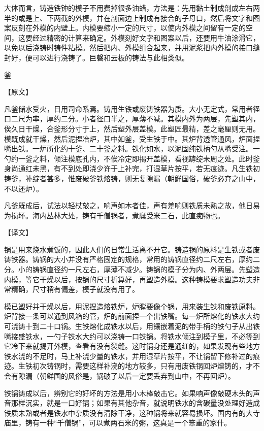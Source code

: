 \documentclass[12pt,UTF8]{ctexbook}
\begin{document}
大体而言，铸造铁钟的模子不用费掉很多油蜡，方法是：先用黏土制成剖成左右两半的或是上、下两截的外模，并在剖面边上制成有接合的子母口，然后将文字和图案反刻在外模的内壁上。内模要缩小一定的尺寸，以使内外模之间留有一定的空间，这要经过精密的计算来确定。外模刻好文字和图案以后，还要用牛油涂滑它，以免以后浇铸时铸件粘模。然后把内、外模组合起来，并用泥浆把内外模的接口缝封好，便可以进行浇铸了。巨磬和云板的铸法与此相类似。

釜

【原文】

凡釜储水受火，日用司命系焉。铸用生铁或废铸铁器为质。大小无定式，常用者径口二尺为率，厚约二分。小者径口半之，厚薄不减。其模内外为两层，先塑其内，俟久日干燥，合釜形分寸于上，然后塑外层盖模。此塑匠最精，差之毫厘则无用。模既成就干燥，然后泥捏冶炉，其中如釜，受生铁于中。其炉背透管通风，炉面捏嘴出铁。一炉所化约十釜、二十釜之料。铁化如水，以泥固纯铁柄勺从嘴受注。一勺约一釜之料，倾注模底孔内，不俟冷定即揭开盖模，看视罅绽未周之处。此时釜身尚通红未黑，有不到处即浇少许于上补完，打湿草片按平，若无痕迹。凡生铁初铸釜，补绽者甚多，惟废破釜铁熔铸，则无复隙漏（朝鲜国俗，破釜必弃之山中，不以还炉）。

凡釜既成后，试法以轻杖敲之，响声如木者佳，声有差响则铁质未熟之故，他日易为损坏。海内丛林大处，铸有千僧锅者，煮糜受米二石，此直痴物也。

【译文】

锅是用来烧水煮饭的，因此人们的日常生活离不开它。铸造锅的原料是生铁或者废铸铁器。铸锅的大小并没有严格固定的规格，常用的铸锅直径约二尺左右，厚约二分。小的铸锅直径约一尺左右，厚薄不减少。铸锅的模子分为内、外两层。先塑造内模，等它干燥以后，按锅的尺寸折算好，再塑造外模。这种铸模要求塑造功夫非常精确，尺寸稍有偏差，模子就没有用了。

模已塑好并干燥以后，用泥捏造熔铁炉，炉膛要像个锅，用来装生铁和废铁原料。炉背接一条可以通到风箱的管，炉的前面捏一个出铁嘴。每一炉所熔化的铁水大约可浇铸十到二十口锅。生铁熔化成铁水以后，用镶嵌着泥的带手柄的铁勺子从出铁嘴接盛铁水，一勺子铁水大约可以浇铸一口铁锅。将铁水倾注到模子里，不必等到它冷下来就揭开外模，查看有没有裂缝。这时锅身还是通红的，如果发现有些地方铁水浇的不足时，马上补浇少量的铁水，并用湿草片按平，不让锅留下修补过的痕迹。生铁初次铸锅时，需要这样补浇的地方较多，只有用废铁锅回炉熔铸的，才不会有隙漏（朝鲜国的风俗是，锅破了以后一定要丢弃到山中，不再回炉）。

铁锅铸成以后，辨别它的好坏的方法是用小木棒敲击它。如果响声像敲硬木头的声音那样沉实，就是一口好锅；如果有其他杂音，就说明铁水的含碳量没处理好造成铁质未熟或者是铁水中杂质没有清除干净，这种锅将来就容易损坏。国内有的大寺庙里，铸有一种“千僧锅”，可以煮两石米的粥，这真是一个笨重的家什。
\end{document}

